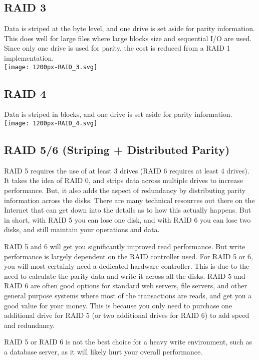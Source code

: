 \documentclass{article}
\begin{document}
\subsection{RAID 3}
Data is striped at the byte level, and one drive is set aside for parity information. This does well for large files where large blocks size and sequential I/O are used. Since only one drive is used for parity, the cost is reduced from a RAID 1 implementation.\\
\texttt{[image: 1200px-RAID\_3.svg]} 

\subsection{RAID 4}
Data is striped in blocks, and one drive is set aside for parity information.\\
\texttt{[image: 1200px-RAID\_4.svg]} 

\subsection{RAID 5/6 (Striping + Distributed Parity)}
RAID 5 requires the use of at least 3 drives (RAID 6 requires at least 4 drives). It takes the idea of RAID 0, and strips data across multiple drives to increase performance. But, it also adds the aspect of redundancy by distributing parity information across the disks. There are many technical resources out there on the Internet that can get down into the details as to how this actually happens. But in short, with RAID 5 you can lose one disk, and with RAID 6 you can lose two disks, and still maintain your operations and data.

RAID 5 and 6 will get you significantly improved read performance. But write performance is largely dependent on the RAID controller used. For RAID 5 or 6, you will most certainly need a dedicated hardware controller. This is due to the need to calculate the parity data and write it across all the disks. RAID 5 and RAID 6 are often good options for standard web servers, file servers, and other general purpose systems where most of the transactions are reads, and get you a good value for your money. This is because you only need to purchase one additional drive for RAID 5 (or two additional drives for RAID 6) to add speed and redundancy.

RAID 5 or RAID 6 is not the best choice for a heavy write environment, such as a database server, as it will likely hurt your overall performance. 
\end{document}
